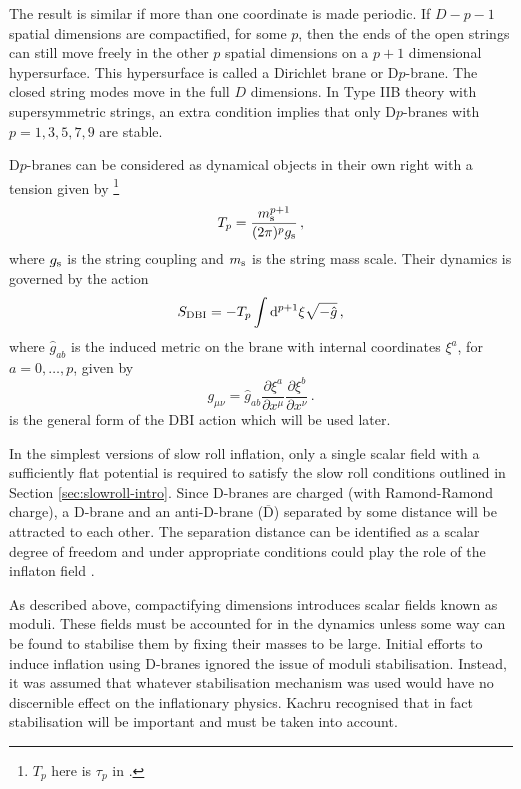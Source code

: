 The result is similar if more than
one coordinate is made periodic.
If $D-p-1$ spatial dimensions are compactified, for some $p$, then the ends of
the open
strings can still move freely in the other $p$ spatial dimensions on a $p+1$
dimensional hypersurface. This hypersurface is called a Dirichlet brane or
D$p$-brane. The closed string modes move in the full $D$ dimensions.
% 
In Type IIB theory with supersymmetric strings, an extra condition implies that
only D$p$-branes with $p=1,3,5,7,9$ are stable\footnotemark.
% 

D$p$-branes can be considered as dynamical objects in their own right with a
tension given by \cite{Johnson2000}\footnote{$T_p$ here is $\tau_p$ in
.}
% 
\begin{equation}
\label{eq:branetensiondefn-dbiintro}
 T_p = \frac{m_\mathrm{s}^{p+1}}{(2\pi)^p g_\mathrm{s}}\,,
\end{equation}
% 
where $g_\mathrm{s}$ is the string coupling and $m_\mathrm{s}$ is the string mass scale.
Their dynamics is governed by the action 
% 
\begin{equation}
\label{eq:gendbiaction-dbiintro}
 S_\mathrm{DBI} = -T_p \int \mathrm{d}^{p+1}\xi \sqrt{-\hat{g}}\,,
\end{equation}
where $\hat{g}_{ab}$ is the induced metric on the brane with internal
coordinates $\xi^a$, for $a=0,\ldots,p$, given by \cite{Johnson2000}
% 
\begin{equation}
 g_{\mu\nu} = \hat{g}_{a b} \frac{\partial \xi^a}{\partial x^\mu} \frac{\partial \xi ^b}{\partial x^\nu}\,.
\end{equation}
% 
 is the general form of the DBI
action which will be used later.


In the simplest versions of slow roll inflation, only a single scalar field
with a
sufficiently flat potential is required to satisfy the slow roll conditions outlined
in
Section \ref{sec:slowroll-intro}. Since D-branes are charged (with Ramond-Ramond
charge), a D-brane and an anti-D-brane
($\overline{\mathrm{D}}$) separated by some distance will be attracted to each other.
The separation distance
can be identified as a scalar degree of freedom and under appropriate conditions
could play the role of the inflaton
field \cite{brane1,brane2,brane3,brane7,Brodie:2003qv,brane9}. 

As described above, compactifying dimensions
introduces scalar fields known as moduli. These fields must be
accounted for in the dynamics unless some way can be found to stabilise them by
fixing their masses to be large.
Initial efforts to induce inflation using D-branes ignored the issue of moduli
stabilisation. Instead, it was
assumed that whatever stabilisation mechanism was used would have no discernible
effect on the inflationary physics. Kachru \etal \cite{brane4} recognised that
in fact stabilisation will be important and must be taken into account.

